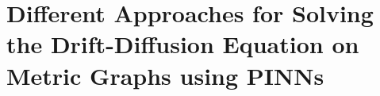 \chapter{Different Approaches for Solving the Drift-Diffusion Equation on Metric Graphs using PINNs}



